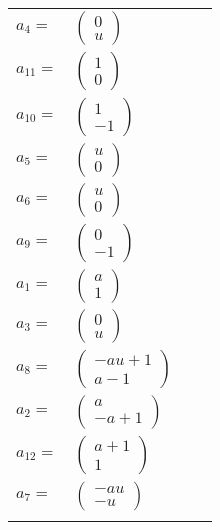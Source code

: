 \documentclass[1p]{elsarticle_modified}
\theoremstyle{definition}
\begin{document}
\begin{tabular}{m{7pt} m{180pt} m{7pt} m{180pt} }
\flushright $a_{4}=$&$\begin{pmatrix}0\\u\end{pmatrix}$ \\
\flushright $a_{11}=$&$\begin{pmatrix}1\\0\end{pmatrix}$ \\
\flushright $a_{10}=$&$\begin{pmatrix}1\\-1\end{pmatrix}$ \\
\flushright $a_{5}=$&$\begin{pmatrix}u\\0\end{pmatrix}$ \\
\flushright $a_{6}=$&$\begin{pmatrix}u\\0\end{pmatrix}$ \\
\flushright $a_{9}=$&$\begin{pmatrix}0\\-1\end{pmatrix}$ \\
\flushright $a_{1}=$&$\begin{pmatrix}a\\1\end{pmatrix}$ \\
\flushright $a_{3}=$&$\begin{pmatrix}0\\u\end{pmatrix}$ \\
\flushright $a_{8}=$&$\begin{pmatrix}- a u+1\\a-1\end{pmatrix}$ \\
\flushright $a_{2}=$&$\begin{pmatrix}a\\- a+1\end{pmatrix}$ \\
\flushright $a_{12}=$&$\begin{pmatrix}a+1\\1\end{pmatrix}$ \\
\flushright $a_{7}=$&$\begin{pmatrix}- a u\\- u\end{pmatrix}$\\&\end{tabular}
\end{document}
